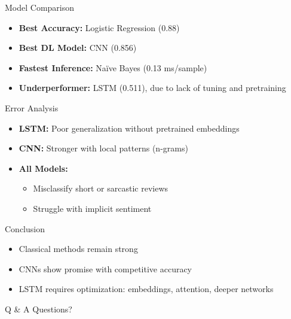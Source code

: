 \documentclass{beamer}
\begin{document}
\begin{frame}{Model Comparison}
\begin{itemize}
  \item \textbf{Best Accuracy:} Logistic Regression (0.88)
  \item \textbf{Best DL Model:} CNN (0.856)
  \item \textbf{Fastest Inference:} Naïve Bayes (0.13 ms/sample)
  \item \textbf{Underperformer:} LSTM (0.511), due to lack of tuning and pretraining
\end{itemize}
\end{frame}

\begin{frame}{Error Analysis}
\begin{itemize}
  \item \textbf{LSTM:} Poor generalization without pretrained embeddings
  \item \textbf{CNN:} Stronger with local patterns (n-grams)
  \item \textbf{All Models:}
  \begin{itemize}
    \item Misclassify short or sarcastic reviews
    \item Struggle with implicit sentiment
  \end{itemize}
\end{itemize}
\end{frame}

\begin{frame}{Conclusion}
\begin{itemize}
  \item Classical methods remain strong
  \item CNNs show promise with competitive accuracy
  \item LSTM requires optimization: embeddings, attention, deeper networks
\end{itemize}
\end{frame}

\begin{frame}{Q \& A}
\centering
\Huge Questions?
\end{frame}
\end{document}
